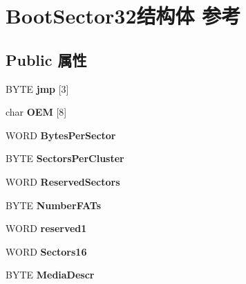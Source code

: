 \hypertarget{struct_boot_sector32}{}\section{Boot\+Sector32结构体 参考}
\label{struct_boot_sector32}
\subsection*{Public 属性}
\begin{DoxyCompactItemize}
\item 
\mbox{\label{struct_boot_sector32_a597dccc213657e1c4f662e8df92e97bb}} 
B\+Y\+TE {\bfseries jmp} \mbox{[}3\mbox{]}
\item 
\mbox{\label{struct_boot_sector32_a93b0cc5a8e7056841535e18f07696978}} 
char {\bfseries O\+EM} \mbox{[}8\mbox{]}
\item 
\mbox{\label{struct_boot_sector32_a89503a48b8f03b9d0864a4b72663ca5a}} 
W\+O\+RD {\bfseries Bytes\+Per\+Sector}
\item 
\mbox{\label{struct_boot_sector32_a0d391548a2cd415240efd2eafc7adcd0}} 
B\+Y\+TE {\bfseries Sectors\+Per\+Cluster}
\item 
\mbox{\label{struct_boot_sector32_aa52225cde2d0577720c637309da1d364}} 
W\+O\+RD {\bfseries Reserved\+Sectors}
\item 
\mbox{\label{struct_boot_sector32_a6d24ed251261a28e4dd01021b4a811dc}} 
B\+Y\+TE {\bfseries Number\+F\+A\+Ts}
\item 
\mbox{\label{struct_boot_sector32_aab03e6e4f9486d20fe28b9fb4386f35e}} 
W\+O\+RD {\bfseries reserved1}
\item 
\mbox{\label{struct_boot_sector32_a5697d48b8dc21734e8b2e5fe8dd42989}} 
W\+O\+RD {\bfseries Sectors16}
\item 
\mbox{\label{struct_boot_sector32_a873dfec59ad7225e5effd031f9cb8b47}} 
B\+Y\+TE {\bfseries Media\+Descr}
\item 

\end{DoxyCompactItemize}
